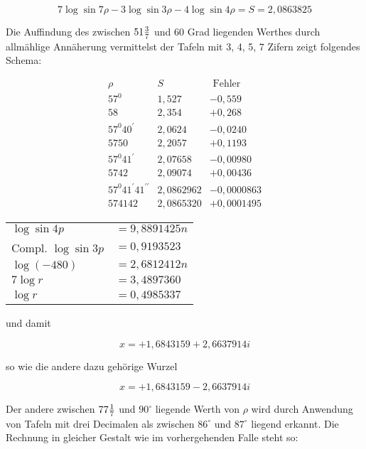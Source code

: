 \documentclass[twoside,12pt, showframe]{memoir}
\let\oldfrac\frac
\def\frac#1#2{\mathchoice{\tfrac{#1}{#2}}{\oldfrac{#1}{#2}}{\genfrac{}{}{}{2}{#1}{#2\mathstrut}}{\genfrac{}{}{}{3}{#1}{#2\mathstrut}}}
\begin{document}
\[
7 \log \sin 7 \rho-3 \log \sin 3 \rho-4 \log \sin 4 \rho=S=2,0863825
\]

Die Auffindung des zwischen \(51 \frac{3}{7}\) und 60 Grad liegenden Werthes durch allmählige Annäherung vermittelst der Tafeln mit 3, 4, 5, 7 Zifern zeigt folgendes Schema:

\[
\begin{array}{l|l|l}
\rho & S & \text { Fehler } \\
57^{0} & 1,527 & -0,559 \\
58 & 2,354 & +0,268 \\
57^{0} 40^{\prime} & 2,0624 & -0,0240 \\
5750 & 2,2057 & +0,1193 \\
57^{0} 41^{\prime} & 2,07658 & -0,00980 \\
5742 & 2,09074 & +0,00436 \\
57^{0} 41^{\prime} 41^{\prime \prime} & 2,0862962 & -0,0000863 \\
574142 & 2,0865320 & +0,0001495
\end{array}
\]

\begin{center}
\end{center}

\begin{center}
\begin{tabular}{ll}
\(\log \sin 4 p\) & \(=9,8891425 n\) \\
Compl. \(\log \sin 3 p\) & \(=0,9193523\) \\
\(\log (-480)\) & \(=2,6812412 n\) \\
\hline
\(7 \log r\) & \(=3,4897360\) \\
\(\log r\) & \(=0,4985337\) \\
\end{tabular}
\end{center}

und damit

\[
x=+1,6843159+2,6637914 i
\]

so wie die andere dazu gehörige Wurzel

\[
x=+1,6843159-2,6637914 i
\]

Der andere zwischen \(77 \frac{1}{7}\) und \(90^{\circ}\) liegende Werth von \(\rho\) wird durch Anwendung von Tafeln mit drei Decimalen als zwischen \(86^{\circ}\) und \(87^{\circ}\) liegend erkannt. Die Rechnung in gleicher Gestalt wie im vorhergehenden Falle steht so:
\end{document}
